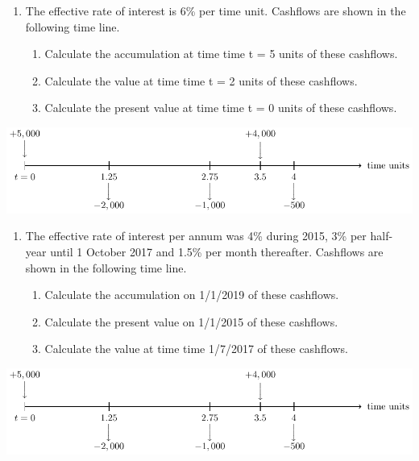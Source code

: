 \documentclass[
]{book}
\theoremstyle{definition}
\theoremstyle{definition}
\theoremstyle{definition}
\theoremstyle{definition}
\theoremstyle{remark}
\begin{document}
\begin{enumerate}
\def\labelenumi{\arabic{enumi}.}
\setcounter{enumi}{2}
\item
  The effective rate of interest is 6\% per time unit. Cashflows are
  shown in the following time line.

  \begin{enumerate}
  \def\labelenumii{\arabic{enumii}.}
  \item
    Calculate the accumulation at time time t = 5 units of these
    cashflows.
  \item
    Calculate the value at time time t = 2 units of these cashflows.
  \item
    Calculate the present value at time time t = 0 units of these
    cashflows.
  \end{enumerate}
\end{enumerate}

\begin{center}\includegraphics{SCMA266Bookdownproj_files/figure-latex/tikz-exam2-1} \end{center}

\begin{enumerate}
\def\labelenumi{\arabic{enumi}.}
\setcounter{enumi}{3}
\item
  The effective rate of interest per annum was 4\% during 2015, 3\% per
  half-year until 1 October 2017 and 1.5\% per month thereafter.
  Cashflows are shown in the following time line.

  \begin{enumerate}
  \def\labelenumii{\arabic{enumii}.}
  \item
    Calculate the accumulation on 1/1/2019 of these cashflows.
  \item
    Calculate the present value on 1/1/2015 of these cashflows.
  \item
    Calculate the value at time time 1/7/2017 of these cashflows.
  \end{enumerate}
\end{enumerate}

\begin{center}\includegraphics{SCMA266Bookdownproj_files/figure-latex/tikz-exam3-1} \end{center}
\end{document}
